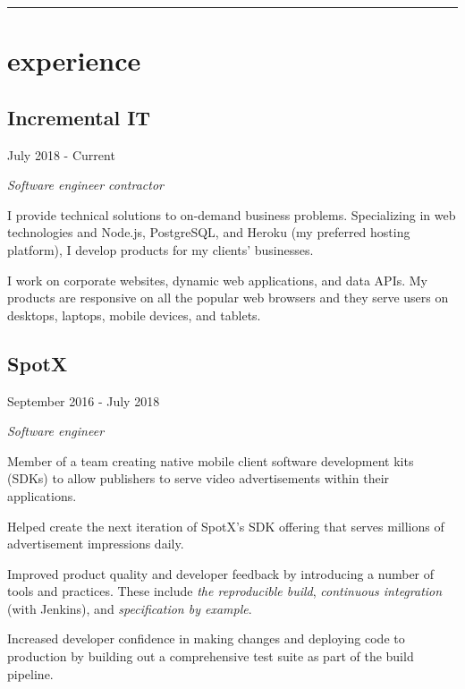 \setlength{\parindent}{0cm}
\setlength{\parskip}{0.5em}

\begin{samepage}
  \hrule
  \section*{experience}
\end{samepage}

\noindent\begin{minipage}[t]{0.5\textwidth}
  \subsection*{Incremental IT}
\end{minipage}
\noindent\begin{minipage}[t]{0.5\textwidth}
  \flushright
  July 2018 - Current
\end{minipage}

\emph{Software engineer contractor}

{\small I provide technical solutions to on-demand business problems.
  Specializing in web technologies and Node.js, PostgreSQL, and Heroku (my
  preferred hosting platform), I develop products for my clients' businesses.

  I work on corporate websites, dynamic web applications, and data APIs. My
  products are responsive on all the popular web browsers and they serve users
  on desktops, laptops, mobile devices, and tablets. }

\vspace{1em}
\noindent\begin{minipage}[t]{0.5\textwidth}
  \subsection*{SpotX}
\end{minipage}
\noindent\begin{minipage}[t]{0.5\textwidth}
  \flushright
  September 2016 - July 2018
\end{minipage}

\emph{Software engineer}

{\small Member of a team creating native mobile client software development kits
  (SDKs) to allow publishers to serve video advertisements within their
  applications.

  Helped create the next iteration of SpotX's SDK offering that serves millions
  of advertisement impressions daily.

  Improved product quality and developer feedback by introducing a number of
  tools and practices. These include \emph{the reproducible build},
  \emph{continuous integration} (with Jenkins), and \emph{specification by
    example}.

  Increased developer confidence in making changes and deploying code to
  production by building out a comprehensive test suite as part of the build
  pipeline. }

